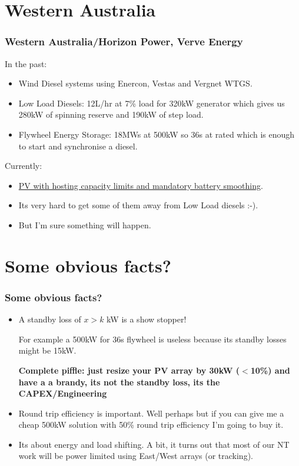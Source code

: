 \documentclass{beamer}
\begin{document}
\section{Western Australia}
\begin{frame}\frametitle{Western Australia/Horizon Power, Verve Energy}
In the past:
\pause
\begin{itemize}
\item Wind Diesel systems using Enercon, Vestas and Vergnet WTGS.
\pause
\item Low Load Diesels: 12L/hr at 7\% load for 320kW generator which
gives us 280kW of spinning reserve and 190kW of step load.
\pause
\item Flywheel Energy Storage: 18MWs at 500kW so 36s at rated which is
  enough to start and synchronise a diesel.
\pause
\end{itemize}
\pause
Currently:
\begin{itemize}
\item \href{http://www.horizonpower.com.au/documents/TECHNICAL_REQUIREMENTS_FOR_RENEWABLE_ENERGY_SYSTEMS___LOW_VOLTAGE_NETWORK3548309.PDF}{PV with hosting
capacity limits and mandatory battery smoothing}.
\pause
\item Its very hard to get some of them away from Low Load diesels :-).\pause
\item But I'm sure something will happen.
\end{itemize}
\end{frame}

\section{Some obvious facts?}
\begin{frame}\frametitle{Some obvious facts?}
  \begin{itemize}
  \item A standby loss of $x>k$ kW is a show stopper!\pause

    For example a 500kW for 36s flywheel is useless because its 
    standby losses might be 15kW.\pause

    \textbf{Complete piffle: just resize your PV array by 30kW ($<$10\%) and have a 
    a brandy, its not the standby loss, its the CAPEX/Engineering}\pause
  \item Round trip efficiency is important.\pause
    Well perhaps but if you can give me a cheap 500kW solution with 50\%
    round trip efficiency I'm going to buy it.\pause
  \item Its about energy and load shifting.\pause
    A bit, it turns out that most of our NT work will be power limited using 
    East/West arrays (or tracking). 
  \end{itemize}
\end{frame}
\end{document}
